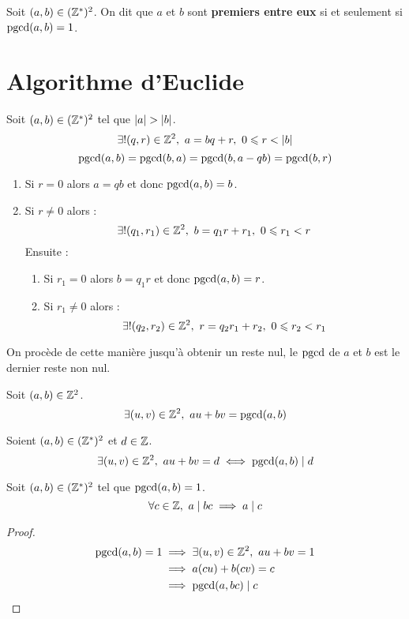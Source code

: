 \begin{definition}
	Soit $(a,b) \in (\mathbb{Z}^*)^2$. On dit que $a$ et $b$ sont \textbf{premiers entre eux} si et seulement si $\operatorname{pgcd}(a, b) = 1$.
\end{definition}

\section{Algorithme d'Euclide}
\begin{proposition}
	Soit $(a, b) \in (\mathbb{Z}^*)^2$ tel que $\abs{a} > \abs{b}$.
	\[ \exists ! (q,r) \in \mathbb{Z}^2,\ a = bq + r,\ 0 \leqslant r < \abs{b} \]
	\[ \operatorname{pgcd}(a, b) = \operatorname{pgcd}(b, a) = \operatorname{pgcd}(b, a - qb) = \operatorname{pgcd}(b, r) \]
	\begin{enumerate}
		\item Si $r = 0$ alors $a = qb$ et donc $\operatorname{pgcd}(a, b) = b$.
		\item Si $r \neq 0$ alors :
		\[ \exists ! (q_1, r_1) \in \mathbb{Z}^2,\ b = q_1 r + r_1,\ 0 \leqslant r_1 < r \]
		Ensuite : 
		\begin{enumerate}
			\item Si $r_1 = 0$ alors $b = q_1 r$ et donc $\operatorname{pgcd}(a, b) = r$.
			\item Si $r_1 \neq 0$ alors :
			\[ \exists ! (q_2, r_2) \in \mathbb{Z}^2,\ r = q_2 r_1 + r_2,\ 0 \leqslant r_2 < r_1 \]
		\end{enumerate}
	\end{enumerate}
	
	On procède de cette manière jusqu'à obtenir un reste nul, le $\operatorname{pgcd}$ de $a$ et $b$ est le dernier reste non nul.
\end{proposition}

\begin{theorem}
	Soit $(a, b) \in \mathbb{Z}^2$.
	\[ \exists (u, v) \in \mathbb{Z}^2,\ au + bv = \operatorname{pgcd}(a, b) \]
\end{theorem}

\begin{corollary}
	Soient $(a, b) \in (\mathbb{Z}^*)^2$ et $d \in \mathbb{Z}$.
	\[ \exists (u, v) \in \mathbb{Z}^2,\ au + bv = d \iff \operatorname{pgcd}(a,b) \mid d \]
\end{corollary}

\begin{lemma}
	Soit $(a, b) \in (\mathbb{Z}^*)^2$ tel que $\operatorname{pgcd}(a, b) = 1$.
	\[ \forall c \in \mathbb{Z},\ a \mid bc \implies a \mid c \]
\end{lemma}

\begin{proof}
	\begin{align*}
		\operatorname{pgcd}(a, b) = 1 &\implies \exists(u, v) \in \mathbb{Z}^2,\ au + bv = 1 \\
		&\implies a(cu) + b(cv) = c \\ 
		&\implies \operatorname{pgcd}(a, bc) \mid c
	\end{align*}
\end{proof}

